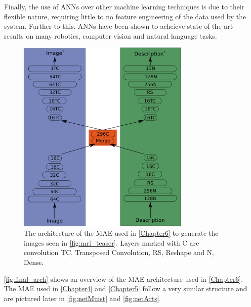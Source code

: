 Finally, the use of \acp{ANN} over other machine learning techniques is due to their flexible nature, requiring little to no feature engineering of the data used by the system. Further to this, \acp{ANN} have been shown to acheieve state-of-the-art results on many robotics, computer vision and natural language tasks.

\begin{figure}
\centering
\includegraphics[width=0.75\textwidth]{Figs/chapter6/maeArch.png}

\caption{The architecture of the \ac{MAE} used in \autoref{Chapter6} to generate the images seen in \autoref{fig:mrl_teaser}. Layers marked with C are convolution TC, Transposed Convolution, RS, Reshape and N, Dense.}
\label{fig:final_arch}
\end{figure}

\autoref{fig:final_arch} shows an overview of the \ac{MAE} architecture used in \autoref{Chapter6}. The \ac{MAE} used in \autoref{Chapter4} and \autoref{Chapter5} follow a very similar structure and are pictured later in \autoref{fig:netMnist} and \autoref{fig:netArts}. 











